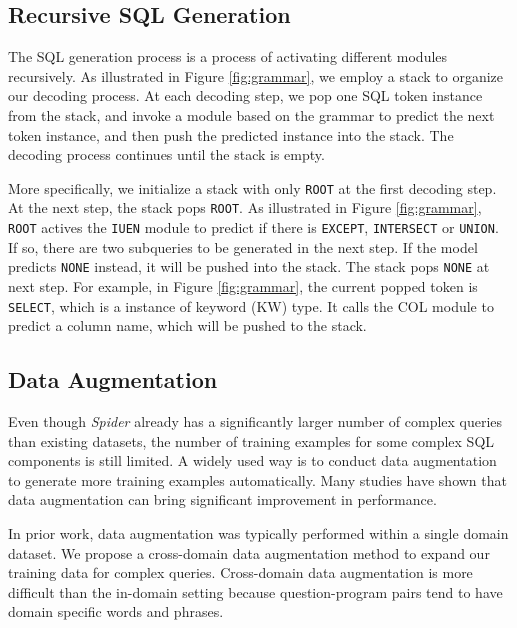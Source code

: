 \documentclass[11pt,a4paper]{article}
\begin{document}
\subsection{Recursive SQL Generation}
\label{sec:tree_decoder}

The SQL generation process is a process of activating different modules recursively. 
As illustrated in Figure \ref{fig:grammar}, we employ a stack to organize our decoding process.
At each decoding step, we pop one SQL token instance from the stack, and invoke a module based on the grammar to predict the next token instance, and then push the predicted instance into the stack. The decoding process continues until the stack is empty.

More specifically, we initialize a stack with only \texttt{ROOT} at the first decoding step.
At the next step, the stack pops \texttt{ROOT}.
As illustrated in Figure \ref{fig:grammar}, \texttt{ROOT} actives the \texttt{IUEN} module to predict if there is \texttt{EXCEPT}, \texttt{INTERSECT} or \texttt{UNION}. If so, there are two subqueries to be generated in the next step.
If the model predicts \texttt{NONE} instead, it will be pushed into the stack. The stack pops \texttt{NONE} at next step.
For example, in Figure \ref{fig:grammar}, the current popped token is \texttt{SELECT}, which is a instance of keyword (KW) type. It calls the COL module to predict a column name, which will be pushed to the stack.

\subsection{Data Augmentation}
Even though \textit{Spider} already has a significantly larger number of complex queries than existing datasets, the number of training examples for some complex SQL components is still limited.
A widely used way is to conduct data augmentation to generate more training examples automatically.
Many studies \cite{Berant14, iyer17, SuY17a} have shown that data augmentation can bring significant improvement in performance.

In prior work, data augmentation was typically performed within a single domain dataset.
We propose a cross-domain data augmentation method to expand our training data for complex queries.
Cross-domain data augmentation is more difficult than the in-domain setting because question-program pairs tend to have domain specific words and phrases.
\end{document}
